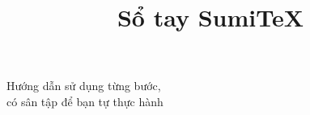 \documentclass[11pt]{article}
\title{Sổ tay SumiTeX}
\newcommand{\ThuMuc}{phien-ban/\PhienBan}
\begin{document}
  {Hướng dẫn sử dụng từng bước,\\ có sân tập để bạn tự thực hành}
  {\PhienBan}
\thispagestyle{plain}
\tableofcontents
\newpage


\end{document}
